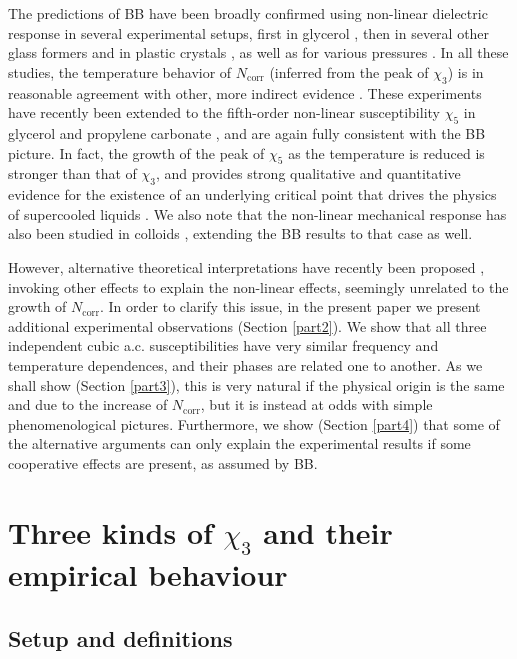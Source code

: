 \documentclass[single column,pre]{revtex4}
\begin{document}
The predictions of BB have been broadly confirmed using non-linear dielectric response in several experimental setups, first in glycerol \cite{Cra10}, then in several other glass formers \cite{Bau13} and in plastic crystals \cite{Mic16}, as well as for various pressures \cite{Cas15}. In all these studies, the temperature behavior of $N_{\text{corr}}$ (inferred from the peak of $\chi_3$) is in reasonable agreement with other, more indirect evidence \cite{Bau13,Mic16,Cas15,Ber05,Dal07}. These experiments have recently been extended to the fifth-order non-linear susceptibility $\chi_5$ in glycerol and propylene carbonate \cite{Alb16}, and are again fully consistent with the BB picture. In fact, the growth of the peak of $\chi_5$ as the temperature is reduced is stronger than that of $\chi_3$, and provides strong qualitative and quantitative evidence for the existence of an underlying critical point that drives the physics of supercooled liquids \cite{Alb16}. We also note that the non-linear mechanical response has also been studied in colloids \cite{Bra10,Sey16}, extending the BB results \cite{Bou05,Tar10} to that case as well.  

However, alternative theoretical interpretations have recently been proposed \cite{Ric16a,Ric16b}, invoking other effects to explain the non-linear effects, seemingly unrelated to the growth of $N_{\text{corr}}$. 
In order to clarify this issue, in the present paper we present additional experimental observations (Section \ref{part2}). We show that all three independent cubic a.c. susceptibilities have very similar frequency and temperature dependences, and their phases are related one to another. As we shall show (Section \ref{part3}), this 
is very natural if the physical origin is the same and due to the increase of $N_{\text{corr}}$, 
but it is instead at odds with simple phenomenological pictures. Furthermore, we show (Section \ref{part4}) that some of the alternative arguments can only explain the experimental results if some cooperative effects are present, as assumed by BB. 
    
\section{\label{part2} Three kinds of $\chi_3$ and their empirical behaviour}

\subsection{\label{part2-1} Setup and definitions}
\end{document}

